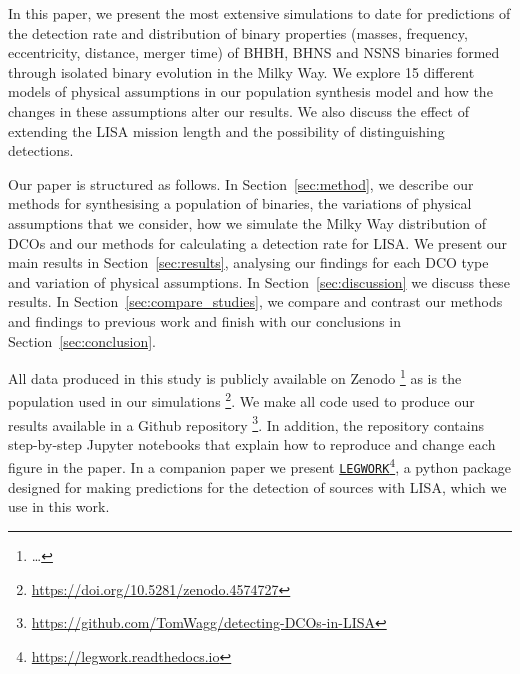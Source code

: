 In this paper, we present the most extensive simulations to date for predictions of the detection rate and distribution of binary properties (masses, frequency, eccentricity, distance, merger time) of BHBH, BHNS and NSNS binaries formed through isolated binary evolution in the Milky Way. We explore 15 different models of physical assumptions in our population synthesis model and how the changes in these assumptions alter our results. We also discuss the effect of extending the LISA mission length and the possibility of distinguishing detections.

Our paper is structured as follows. In Section~\ref{sec:method}, we describe our methods for synthesising a population of binaries, the variations of physical assumptions that we consider, how we simulate the Milky Way distribution of DCOs and our methods for calculating a detection rate for LISA. We present our main results in Section~\ref{sec:results}, analysing our findings for each DCO type and variation of physical assumptions. In Section~\ref{sec:discussion} we discuss these results. In Section~\ref{sec:compare_studies}, we compare and contrast our methods and findings to previous work and finish with our conclusions in Section~\ref{sec:conclusion}.

All data produced in this study is publicly available on Zenodo \href{https://doi.org/10.5281/zenodo.4574727}{\faFileCode}\footnote{\dots}  as is the population used in our simulations \href{https://doi.org/10.5281/zenodo.4574727}{\faFileCode}\footnote{\url{https://doi.org/10.5281/zenodo.4574727}}. We make all code used to produce our results available in a Github repository \href{https://github.com/TomWagg/detecting-DCOs-in-LISA}{\faGithub}\footnote{\url{https://github.com/TomWagg/detecting-DCOs-in-LISA}}. In addition, the repository contains step-by-step Jupyter notebooks that explain how to reproduce and change each figure in the paper. In a companion paper we present \href{https://legwork.readthedocs.io}{\texttt{LEGWORK}}\footnote{\url{https://legwork.readthedocs.io}}, a python package designed for making predictions for the detection of sources with LISA, which we use in this work.